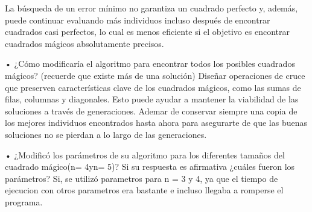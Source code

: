 \documentclass{report}
\begin{document}
    La búsqueda de un error mínimo no garantiza un cuadrado perfecto y, además, puede continuar evaluando más individuos incluso después de encontrar cuadrados casi perfectos, lo cual es menos eficiente si el objetivo es encontrar cuadrados mágicos absolutamente precisos.

    •  ¿Cómo modificaría el algoritmo para encontrar todos los posibles cuadrados mágicos? (recuerde que existe más de una solución)
    Diseñar operaciones de cruce que preserven características clave de los cuadrados mágicos, como las sumas de filas, columnas y diagonales. Esto puede ayudar a mantener la viabilidad de las soluciones a través de generaciones.
    Ademar de conservar siempre una copia de los mejores individuos encontrados hasta ahora para asegurarte de que las buenas soluciones no se pierdan a lo largo de las generaciones.

    •  ¿Modificó  los  parámetros  de  su  algoritmo  para  los  diferentes  tamaños  del  cuadrado  mágico(n= 4yn= 5)? Si su respuesta es afirmativa ¿cuáles fueron los parámetros?
    Si, se utilizó parametros para n = 3 y 4, ya que el tiempo de ejecucion con otros parametros era bastante e incluso llegaba a romperse el programa.
    
\end{document}
